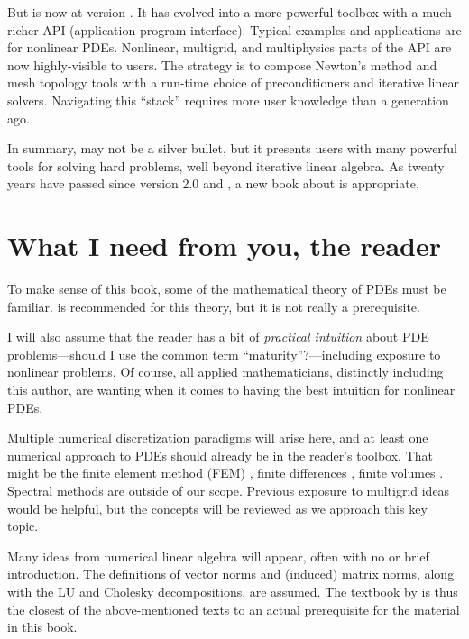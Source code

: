But \PETSc is now at version \PETSCVERSION.  It has evolved into a more powerful toolbox with a much richer API (application program interface).  Typical examples and applications are for nonlinear PDEs.  Nonlinear, multigrid, and multiphysics parts of the API are now highly-visible to users.  The \PETSc strategy is to compose Newton's method and mesh topology tools with a run-time choice of preconditioners and iterative linear solvers.  Navigating this ``stack'' requires more user knowledge than a generation ago.

In summary, \PETSc may not be a silver bullet, but it presents users with many powerful tools for solving hard problems, well beyond iterative linear algebra.  As twenty years have passed since version 2.0 and \citet{Smithetal1996}, a new book about \PETSc is appropriate.


\section{What I need from you, the reader}

To make sense of this book, some of the mathematical theory of PDEs must be familiar.  \citet{Evans2010} is recommended for this theory, but it is not really a prerequisite.

I will also assume that the reader has a bit of \emph{practical intuition} about PDE problems---should I use the common term ``maturity''?---including exposure to nonlinear problems.  Of course, all applied mathematicians, distinctly including this author, are wanting when it comes to having the best intuition for nonlinear PDEs.

Multiple numerical discretization paradigms will arise here, and at least one numerical approach to PDEs should already be in the reader's toolbox.  That might be the finite element method (FEM) \citep{Braess2007,Elmanetal2005,KarniadakisSherwin2013}, finite differences \citep{MortonMayers2005}, finite volumes \citep{LeVeque2002}.  Spectral methods \citep{Trefethen2000} are outside of our scope.  Previous exposure to multigrid ideas \citep{Briggsetal2000} would be helpful, but the concepts will be reviewed as we approach this key topic.

Many ideas from numerical linear algebra \citep{Greenbaum1997,TrefethenBau1997} will appear, often with no or brief introduction.  The definitions of vector norms and (induced) matrix norms, along with the LU and Cholesky decompositions, are assumed.  The textbook by \citet{TrefethenBau1997} is thus the closest of the above-mentioned texts to an actual prerequisite for the material in this book.


